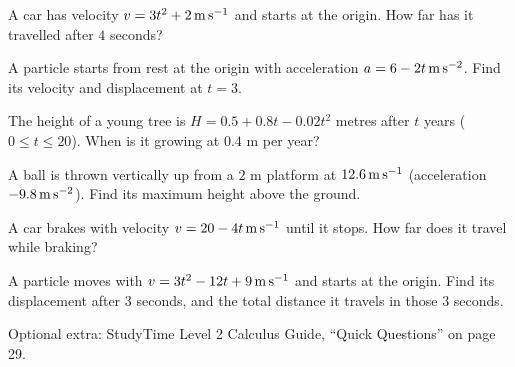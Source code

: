 \documentclass[11pt]{article}
\begin{document}
\Q A car has velocity $v=3t^{2}+2\,\mathrm{m\,s^{-1}}$ and starts at the origin. How far has it travelled after $4$ seconds?

\Q A particle starts from rest at the origin with acceleration $a=6-2t\,\mathrm{m\,s^{-2}}$. Find its velocity and displacement at $t=3$.

\Q The height of a young tree is $H=0.5+0.8t-0.02t^{2}$ metres after $t$ years ($0\le t\le20$). When is it growing at $0.4$ m per year?

\Q A ball is thrown vertically up from a $2$ m platform at $12.6\,\mathrm{m\,s^{-1}}$ (acceleration $-9.8\,\mathrm{m\,s^{-2}}$). Find its maximum height above the ground.

\Q A car brakes with velocity $v=20-4t\,\mathrm{m\,s^{-1}}$ until it stops. How far does it travel while braking?

\QX A particle moves with $v=3t^{2}-12t+9\,\mathrm{m\,s^{-1}}$ and starts at the origin. Find its displacement after $3$ seconds, and the total distance it travels in those $3$ seconds.

\vfill
{\small Optional extra: StudyTime Level 2 Calculus Guide, ``Quick Questions'' on page 29.\par}
\end{document}
